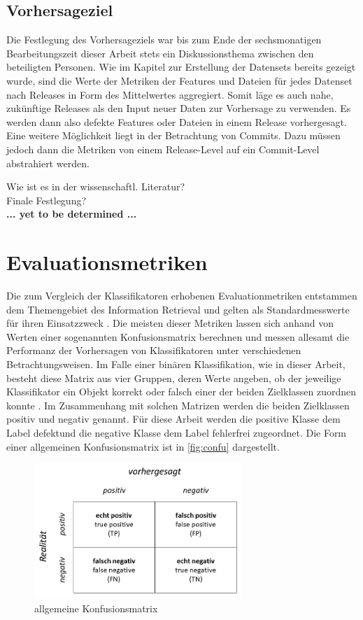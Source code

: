 \subsection*{Vorhersageziel}
Die Festlegung des Vorhersageziels war bis zum Ende der sechsmonatigen Bearbeitungszeit dieser Arbeit stets ein Diskussionsthema zwischen den beteiligten Personen. Wie im Kapitel zur Erstellung der Datensets bereits gezeigt wurde, sind die Werte der Metriken der Features und Dateien für jedes Datenset nach Releases in Form des Mittelwertes aggregiert. Somit läge es auch nahe, zukünftige Releases als den Input neuer Daten zur Vorhersage zu verwenden. Es werden dann also defekte Features oder Dateien in einem Release vorhergesagt. Eine weitere Möglichkeit liegt in der Betrachtung von Commits. Dazu müssen jedoch dann die Metriken von einem Release-Level auf ein Commit-Level abstrahiert werden.

Wie ist es in der wissenschaftl. Literatur? \\
Finale Festlegung? \\
\textbf{... yet to be determined ...}

\section{Evaluationsmetriken}
\label{eval-metrics}

Die zum Vergleich der Klassifikatoren erhobenen Evaluationmetriken entstammen dem Themengebiet des Information Retrieval und gelten als Standardmesswerte für ihren Einsatzzweck \cite{Sammut2017}. Die meisten dieser Metriken lassen sich anhand von Werten einer sogenannten Konfusionsmatrix berechnen und messen allesamt die Performanz der Vorhersagen von Klassifikatoren unter verschiedenen Betrachtungsweisen. Im Falle einer binären Klassifikation, wie in dieser Arbeit, besteht diese Matrix aus vier Gruppen, deren Werte angeben, ob der jeweilige Klassifikator ein Objekt korrekt oder falsch einer der beiden Zielklassen zuordnen konnte \cite{Sammut2017}. Im Zusammenhang mit solchen Matrizen werden die beiden Zielklassen \glqq positiv\grqq{} und \glqq negativ\grqq{} genannt. Für diese Arbeit werden die positive Klasse dem Label \glqq defekt\grqq und die negative Klasse dem Label \glqq fehlerfrei\grqq{} zugeordnet. Die Form einer allgemeinen Konfusionsmatrix ist in \autoref{fig:confu} dargestellt.

\begin{figure}[H]
    \centering
    \includegraphics[width=0.7\textwidth]{images/Confusion}
    \caption{allgemeine Konfusionsmatrix\label{fig:confu}}
\end{figure}

